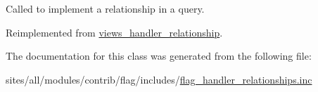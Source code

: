 Called to implement a relationship in a query. 

Reimplemented from \hyperlink{classviews__handler__relationship_7dc0b6371807dbf06efa594cb52b3348}{views\_\-handler\_\-relationship}.

The documentation for this class was generated from the following file:\begin{CompactItemize}
\item 
sites/all/modules/contrib/flag/includes/\hyperlink{flag__handler__relationships_8inc}{flag\_\-handler\_\-relationships.inc}\end{CompactItemize}
